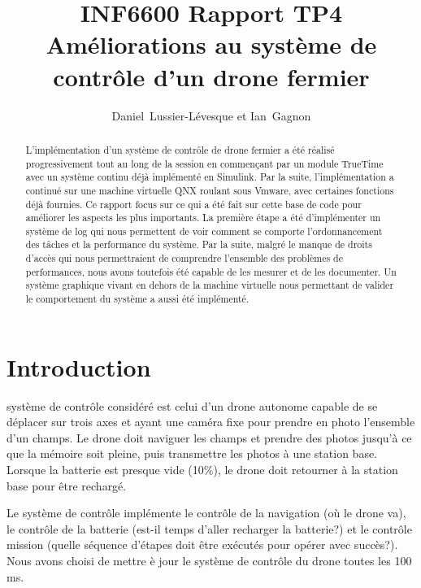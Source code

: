 \documentclass[journal]{IEEEtran}
\begin{document}
\title{INF6600 Rapport TP4 \\ Améliorations au système de contrôle d'un drone fermier}


\author{Daniel~Lussier-Lévesque et Ian~Gagnon}

\maketitle

\begin{abstract}
L'implémentation d'un système de contrôle de drone fermier a été réalisé progressivement tout au long de la session en commençant par un module TrueTime avec un système continu déjà implémenté en Simulink. Par la suite, l'implémentation a continué sur une machine virtuelle QNX roulant sous Vmware, avec certaines fonctions déjà fournies. Ce rapport focus sur ce qui a été fait sur cette base de code pour améliorer les aspects les plus importants. La première étape a été d'implémenter un système de log qui nous permettent de voir comment se comporte l'ordonnancement des tâches et la performance du système. Par la suite, malgré le manque de droits d'accès qui nous permettraient de comprendre l'ensemble des problèmes de performances, nous avons toutefois été capable de les mesurer et de les documenter. Un système graphique vivant en dehors de la machine virtuelle nous permettant de valider le comportement du système a aussi été implémenté.
\end{abstract}


\section{Introduction}
 système de contrôle considéré est celui d'un drone autonome capable de se déplacer sur trois axes et ayant une caméra fixe pour prendre en photo l'ensemble d'un champs. Le drone doit naviguer les champs et prendre des photos jusqu'à ce que la mémoire soit pleine, puis transmettre les photos à une station base. Lorsque la batterie est presque vide (10\%), le drone doit retourner à la station base pour être rechargé. 

Le système de contrôle implémente le contrôle de la navigation (où le drone va), le contrôle de la batterie (est-il temps d'aller recharger la batterie?) et le contrôle mission (quelle séquence d'étapes doit être exécutés pour opérer avec succès?). Nous avons choisi de mettre è jour le système de contrôle du drone toutes les 100 ms.
\end{document}

